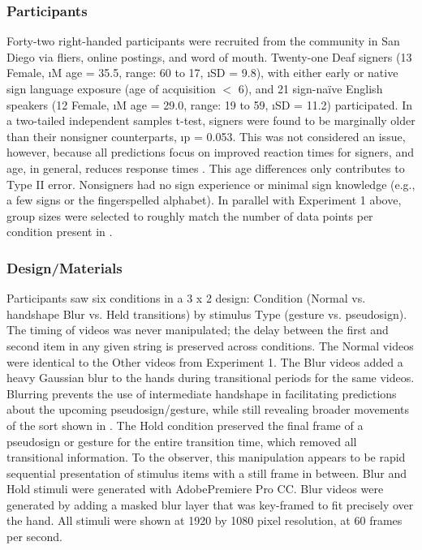         \subsubsection{Participants}
            Forty-two right-handed participants were recruited from the community in San Diego via fliers, online postings, and word of mouth. Twenty-one Deaf signers (13 Female, \i{M} age = 35.5, range: 60 to 17, \i{SD} = 9.8), with either early or native sign language exposure (age of acquisition $<$ 6), and 21 sign-na\"ive English speakers (12 Female, \i{M} age = 29.0, range: 19 to 59, \i{SD} = 11.2) participated. In a two-tailed independent samples t-test, signers were found to be marginally older than their nonsigner counterparts, \i{p} = 0.053. This was not considered an issue, however, because all predictions focus on improved reaction times for signers, and age, in general, reduces response times \cite{der2006}. This age differences only contributes to Type II error. Nonsigners had no sign experience or minimal sign knowledge (e.g., a few signs or the fingerspelled alphabet). In parallel with Experiment 1 above, group sizes were selected to roughly match the number of data points per condition present in . \par
        \subsubsection{Design/Materials} 
            Participants saw six conditions in a 3 x 2 design: Condition (Normal vs. handshape Blur vs. Held transitions) by stimulus Type (gesture vs. pseudosign). The timing of videos was never manipulated; the delay between the first and second item in any given string is preserved across conditions. The Normal videos were identical to the Other videos from Experiment 1. The Blur videos added a heavy Gaussian blur to the hands during transitional periods for the same videos. Blurring prevents the use of intermediate handshape in facilitating predictions about the upcoming pseudosign/gesture, while still revealing broader movements of the sort shown in . The Hold condition preserved the final frame of a pseudosign or gesture for the entire transition time, which removed all transitional information. To the observer, this manipulation appears to be rapid sequential presentation of stimulus items with a still frame in between. Blur and Hold stimuli were generated with Adobe\txreg  Premiere Pro CC. Blur videos were generated by adding a masked blur layer that was key-framed to fit precisely over the hand. All stimuli were shown at 1920 by 1080 pixel resolution, at 60 frames per second. \par
